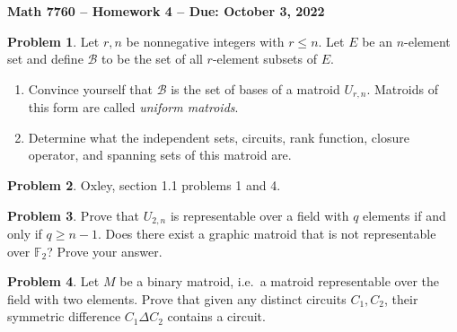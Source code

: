 \documentclass[letterpaper,11pt]{amsart}
\theoremstyle{plain}
\theoremstyle{definition}
\newtheorem{pr}{Problem}
\theoremstyle{remark}
\begin{document}
\Large

\begin{center}
{\bf Math 7760 -- Homework  4 --  Due:  October 3, 2022}
\end{center}

\normalsize


\bigskip


\bigskip

\begin{pr}
    Let $r,n$ be nonnegative integers with $r \le n$.
    Let $E$ be an $n$-element set and define $\mathcal{B}$ to be the set of all $r$-element subsets of $E$.
    \begin{enumerate}
        \item Convince yourself that $\mathcal{B}$ is the set of bases of a matroid $U_{r,n}$.
        Matroids of this form are called \emph{uniform matroids}.
        \item Determine what the independent sets, circuits, rank function, closure operator, and spanning sets of this matroid are.
    \end{enumerate}
\end{pr}

\begin{pr}
    Oxley, section 1.1 problems 1 and 4.
\end{pr}

\bigskip

\bigskip

\begin{pr}
    Prove that $U_{2,n}$ is representable over a field with $q$ elements if and only if $q \ge n-1$.
    Does there exist a graphic matroid that is not representable over $\mathbb{F}_2$? Prove your answer.
\end{pr}

\begin{pr}
    Let $M$ be a binary matroid, i.e.~a matroid representable over the field with two elements.
    Prove that given any distinct circuits $C_1,C_2$, their symmetric difference $C_1 \Delta C_2$ contains a circuit.
\end{pr}

\bigskip
\end{document}
